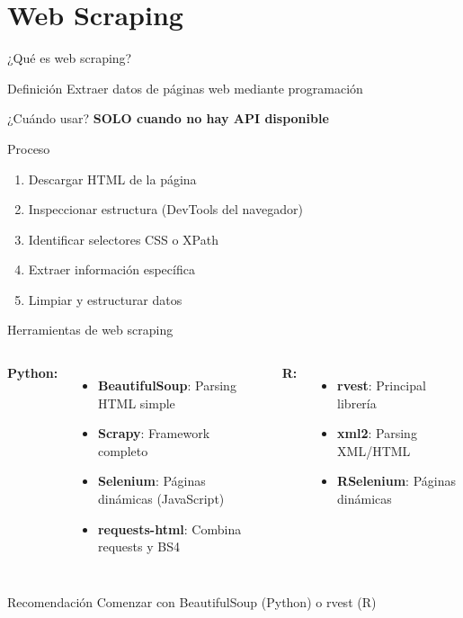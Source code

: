 \documentclass[aspectratio=169]{beamer}
\begin{document}
\section{Web Scraping}

\begin{frame}{¿Qué es web scraping?}
\begin{block}{Definición}
Extraer datos de páginas web mediante programación
\end{block}

\begin{alertblock}{¿Cuándo usar?}
\textbf{SOLO cuando no hay API disponible}
\end{alertblock}

\pause

\begin{block}{Proceso}
\begin{enumerate}
    \item Descargar HTML de la página
    \item Inspeccionar estructura (DevTools del navegador)
    \item Identificar selectores CSS o XPath
    \item Extraer información específica
    \item Limpiar y estructurar datos
\end{enumerate}
\end{block}
\end{frame}

\begin{frame}{Herramientas de web scraping}
\begin{columns}[t]
\textbf{Python:}
\begin{itemize}
    \item \textbf{BeautifulSoup}: Parsing HTML simple
    \item \textbf{Scrapy}: Framework completo
    \item \textbf{Selenium}: Páginas dinámicas (JavaScript)
    \item \textbf{requests-html}: Combina requests y BS4
\end{itemize}

\textbf{R:}
\begin{itemize}
    \item \textbf{rvest}: Principal librería
    \item \textbf{xml2}: Parsing XML/HTML
    \item \textbf{RSelenium}: Páginas dinámicas
\end{itemize}
\end{columns}

\vspace{1em}

\begin{exampleblock}{Recomendación}
Comenzar con BeautifulSoup (Python) o rvest (R)
\end{exampleblock}
\end{frame}
\end{document}
